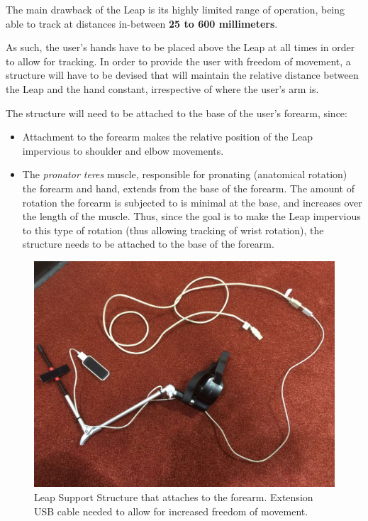 \documentclass[12p,a4paper]{report}
\begin{document}
The main drawback of the Leap is its highly limited range of operation, being able to track at distances in-between \textbf{25 to 600 millimeters}.

As such, the user's hands have to be placed above the Leap at all times in order to allow for tracking. In order to provide the user with freedom of movement, a structure will have to be devised that will maintain the relative distance between the Leap and the hand constant, irrespective of where the user's arm is.

The structure will need to be attached to the base of the user's forearm, since:

\begin{itemize}
\item Attachment to the forearm makes the relative position of the Leap impervious to shoulder and elbow movements.
\item The \emph{pronator teres} muscle, responsible for pronating (anatomical rotation) the forearm and hand, extends from the base of the forearm. The amount of rotation the forearm is subjected to is minimal at the base, and increases over the length of the muscle. Thus, since the goal is to make the Leap impervious to this type of rotation (thus allowing tracking of wrist rotation), the structure needs to be attached to the base of the forearm.
\end{itemize} 

\begin{figure}[H]
\begin{center}
\includegraphics[scale=0.50]{leap_support_structure_low}
\caption{Leap Support Structure that attaches to the forearm. Extension USB cable needed to allow for increased freedom of movement.}
\label{fig:leap_support_structure}
\end{center}
\end{figure}
\end{document}
